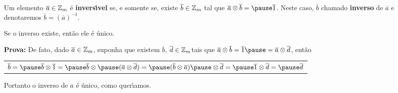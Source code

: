 \documentclass{beamer}
\begin{document}
    \begin{frame}
        \begin{definicao}
            Um elemento $\overline{a} \in \mathbb{Z}_m$ {\'e} \textbf{invers{\'\i}vel} \pause se, e somente se, existe $\overline{b} \in \mathbb{Z}_m$ \pause tal que $\overline{a} \otimes \overline{b} = \pause \overline{1}$. \pause Neste caso, $\overline{b}$  chamado \textbf{inverso} de $\overline{a}$ \pause e denotaremos $\overline{b} = (\overline{a})^{-1}$.\pause
        \end{definicao}

        \begin{proposicao}
            Se o inverso existe, \pause ent\~ao ele {\'e} {\'u}nico.\pause
        \end{proposicao}
        \noindent \textbf{Prova:}
            De fato, \pause dado $\overline{a} \in \mathbb{Z}_m$, \pause suponha que existem $\overline{b}$, \pause $\overline{d} \in \mathbb{Z}_m$\pause tais que $\overline{a} \otimes \overline{b} = \overline{1} \pause = \overline{a} \otimes \overline{d}$, \pause ent{\~a}o\pause
            \begin{center}
                \begin{tabular}{l}
                    $\overline{b} = \pause \overline{b} \otimes \overline{1} = \pause \overline{b} \otimes \pause (\overline{a} \otimes \overline{d}) = \pause (\overline{b} \otimes \overline{a}) \pause \otimes \overline{d} = \pause \overline{1} \otimes \overline{d} = \pause \overline{d}$\pause
                \end{tabular}
            \end{center}
        Portanto o inverso de $\overline{a}$ \'e \'unico, como quer{\'\i}amos. \hspace{.5cm}\qedsymbol\pause
    \end{frame}
\end{document}
